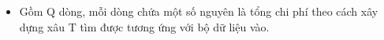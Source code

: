 \begin{itemize}
	\item Gồm Q dòng, mỗi dòng chứa một số nguyên là tổng chi phí theo cách xây dựng xâu T tìm được tương ứng với bộ dữ liệu vào.
\end{itemize}